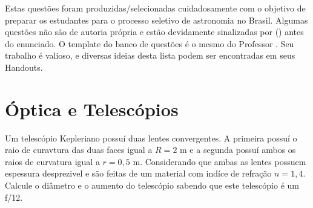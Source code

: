 \documentclass[11pt]{article}
\begin{document}

Estas questões foram produzidas/selecionadas cuidadosamente com o objetivo de preparar os estudantes para o processo seletivo de astronomia no Brasil. Algumas questões não são de autoria própria e estão devidamente sinalizadas por () antes do enunciado. O template do banco de questões é o mesmo do Professor . Seu trabalho é valioso, e diversas ideias desta lista podem ser encontradas em seus Handouts.




\section{Óptica e Telescópios}

    \begin{pproblem} Um telescópio Kepleriano possuí duas lentes convergentes. A primeira possuí o raio de curavtura das duas faces igual a \(R = 2\text{ m}\) e a segunda possuí ambos os raios de curvatura igual a \(r = 0,5 \text{ m}\). Considerando que ambas as lentes possuem espessura desprezivel e são feitas de um material com indíce de refração \(n=1,4\). Calcule o diâmetro e o aumento do telescópio sabendo que este telescópio é um f/12.
    \end{pproblem}
\end{document}
